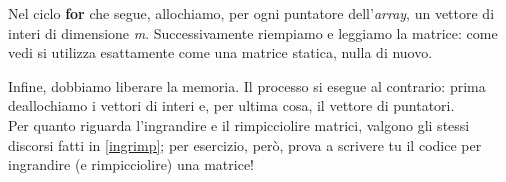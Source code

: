  Nel ciclo \textbf{for} che segue, allochiamo, per ogni puntatore dell'\emph{array}, un vettore di interi di dimensione \emph{m}. Successivamente riempiamo e leggiamo la matrice: come vedi si utilizza esattamente come una matrice statica, nulla di nuovo.
 
 Infine, dobbiamo liberare la memoria. Il processo si esegue al contrario: prima deallochiamo i vettori di interi e, per ultima cosa, il vettore di puntatori. \\
 
 
 Per quanto riguarda l'ingrandire e il rimpicciolire matrici, valgono gli stessi discorsi fatti in \ref{ingrimp}; per esercizio, però, prova a scrivere tu il codice per ingrandire (e rimpicciolire) una matrice!
 